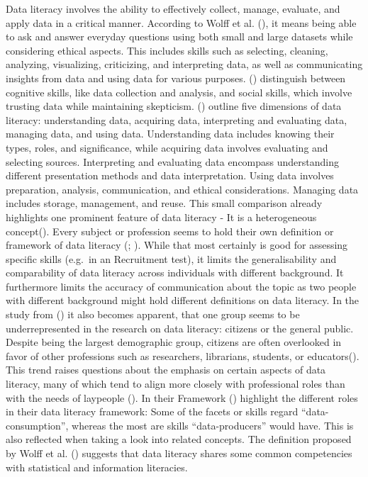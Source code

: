 \documentclass[
  12pt,
  a4paper,
  twoside]{article}
\begin{document}
Data literacy involves the ability to effectively collect, manage, evaluate, and apply data in a critical manner. According to Wolff et al. (), it means being able to ask and answer everyday questions using both small and large datasets while considering ethical aspects. This includes skills such as selecting, cleaning, analyzing, visualizing, criticizing, and interpreting data, as well as communicating insights from data and using data for various purposes. () distinguish between cognitive skills, like data collection and analysis, and social skills, which involve trusting data while maintaining skepticism. () outline five dimensions of data literacy: understanding data, acquiring data, interpreting and evaluating data, managing data, and using data. Understanding data includes knowing their types, roles, and significance, while acquiring data involves evaluating and selecting sources. Interpreting and evaluating data encompass understanding different presentation methods and data interpretation. Using data involves preparation, analysis, communication, and ethical considerations. Managing data includes storage, management, and reuse.
This small comparison already highlights one prominent feature of data literacy - It is a heterogeneous concept(). Every subject or profession seems to hold their own definition or framework of data literacy (; ). While that most certainly is good for assessing specific skills (e.g.~in an Recruitment test), it limits the generalisability and comparability of data literacy across individuals with different background. It furthermore limits the accuracy of communication about the topic as two people with different background might hold different definitions on data literacy. In the study from () it also becomes apparent, that one group seems to be underrepresented in the research on data literacy: citizens or the general public.
Despite being the largest demographic group, citizens are often overlooked in favor of other professions such as researchers, librarians, students, or educators(). This trend raises questions about the emphasis on certain aspects of data literacy, many of which tend to align more closely with professional roles than with the needs of laypeople ().
In their Framework () highlight the different roles in their data literacy framework: Some of the facets or skills regard ``data-consumption'', whereas the most are skills ``data-producers'' would have. This is also reflected when taking a look into related concepts. The definition proposed by Wolff et al. () suggests that data literacy shares some common competencies with statistical and information literacies.
\end{document}

